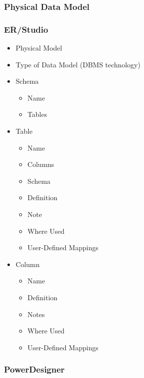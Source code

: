 \subsubsection{Physical Data Model}

\subsubsection{ER/Studio}

\begin{itemize}
	\item Physical Model \\
	\item Type of Data Model (DBMS technology)
	\item Schema
	 \begin{itemize}
	 	\item Name
	 	\item Tables
	 \end{itemize}
	\item Table
	\begin{itemize}
		\item Name
		\item Columns
		\item Schema
		\item Definition
		\item Note
		\item Where Used
		\item User-Defined Mappings
	\end{itemize}
	\item Column
	\begin{itemize}
		\item Name
		\item Definition
		\item Notes
		\item Where Used
		\item User-Defined Mappings
	\end{itemize}
\end{itemize}

\subsubsection{PowerDesigner}

